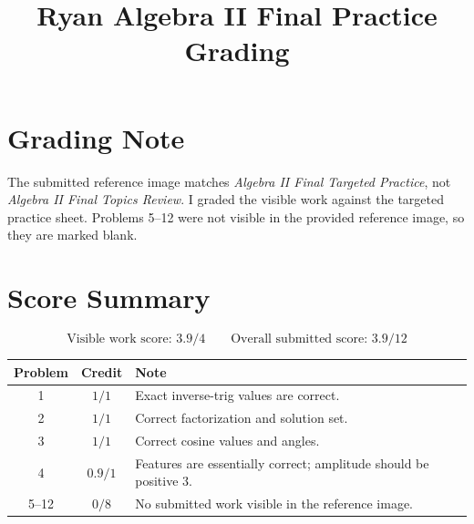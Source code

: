 \documentclass[11pt]{article}
\title{Ryan Algebra II Final Practice Grading}
\author{}
\date{}
\begin{document}
\maketitle

\section*{Grading Note}
The submitted reference image matches \textit{Algebra II Final Targeted Practice}, not \textit{Algebra II Final Topics Review}. I graded the visible work against the targeted practice sheet. Problems 5--12 were not visible in the provided reference image, so they are marked blank.

\section*{Score Summary}
\[
\text{Visible work score: } 3.9/4
\qquad
\text{Overall submitted score: } 3.9/12
\]

\begin{center}
\begin{tabular}{c c l}
\toprule
Problem & Credit & Note\\
\midrule
1 & $1/1$ & Exact inverse-trig values are correct.\\
2 & $1/1$ & Correct factorization and solution set.\\
3 & $1/1$ & Correct cosine values and angles.\\
4 & $0.9/1$ & Features are essentially correct; amplitude should be positive $3$.\\
5--12 & $0/8$ & No submitted work visible in the reference image.\\
\bottomrule
\end{tabular}
\end{center}
\end{document}
